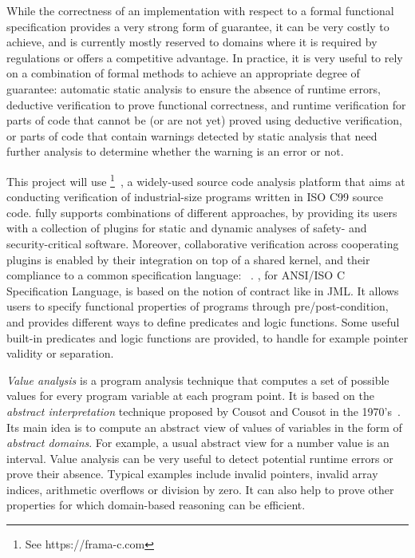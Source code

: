While the correctness of an implementation with respect to a formal
functional specification provides a very strong form of guarantee, it
can be very costly to achieve, and is currently mostly reserved to
domains where it is required by regulations or offers a competitive
advantage. In practice, it is very useful to rely on a combination of
formal methods to achieve an appropriate degree of guarantee:
automatic static analysis to ensure the absence of runtime errors,
deductive verification to prove functional correctness, and runtime
verification for parts of code that cannot be (or are not yet) proved
using deductive verification, or parts of code that contain warnings
detected by static analysis that need further analysis to determine
whether the warning is an error or not.

This project will use \framac{}\footnote{See
  https://frama-c.com}~\cite{KKP2015:FAC}, a widely-used source code analysis
platform that aims at conducting verification of industrial-size
programs written in ISO C99 source code. \framac{} fully supports
combinations of different approaches, by providing its users with a
collection of plugins for static and dynamic analyses of safety- and
security-critical software. Moreover, collaborative verification
across cooperating plugins is enabled by their integration on top of a
shared kernel, and their compliance to a common specification
language: \acsl~\cite{ACSL}.
\acsl, for ANSI/ISO C Specification Language, is based on the notion
of contract like in JML. It allows users to specify functional
properties of programs through pre/post-condition, and provides
different ways to define predicates and logic functions.  Some useful
built-in predicates and logic functions are provided, to handle for
example pointer validity or separation.

\emph{Value analysis} is a program analysis technique that computes a
set of possible values for every program variable at each program
point.  It is based on the \emph{abstract interpretation} technique
proposed by Cousot and Cousot in the 1970's~\cite{cousot77}.  Its main
idea is to compute an abstract view of values of variables in the form
of \emph{abstract domains}. For example, a usual abstract view for a
number value is an interval.
Value analysis can be very useful to detect potential runtime errors
or prove their absence.  Typical examples include invalid pointers,
invalid array indices, arithmetic overflows or division by zero.  It
can also help to prove other properties for which domain-based
reasoning can be efficient.

